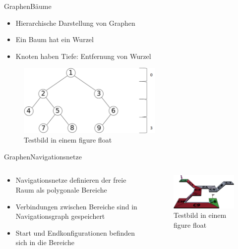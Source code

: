 \documentclass[t,aspectratio=169,dvipsnames]{beamer}
\begin{document}
\begin{frame}{Graphen}{Bäume}
	\begin{itemize}
		\item Hierarchische Darstellung von Graphen
		\item Ein Baum hat ein Wurzel
		\item Knoten haben Tiefe: Entfernung von Wurzel
	\end{itemize}
	
	\begin{figure}
		\includegraphics[width=7.0cm]{images/Bild5.png}
		\caption{Testbild in einem figure float} 
	\end{figure}
\end{frame}
\begin{frame}{Graphen}{Navigationsnetze}
	\begin{columns}
		\begin{column}[T]{0.5\textwidth}
			\begin{itemize}
				\item Navigationsnetze definieren der freie Raum als polygonale Bereiche
				\item Verbindungen zwischen Bereiche sind in Navigationsgraph gespeichert
				\item Start und Endkonfigurationen befinden sich in die Bereiche
			\end{itemize}
		\end{column}
		\begin{column}[T]{0.5\textwidth}
			\begin{figure}
				\includegraphics[width=6.5cm]{images/mesh_with_path.png}
				\caption{Testbild in einem figure float} 
			\end{figure}
		\end{column}
	\end{columns}
\end{frame}
\end{document}
